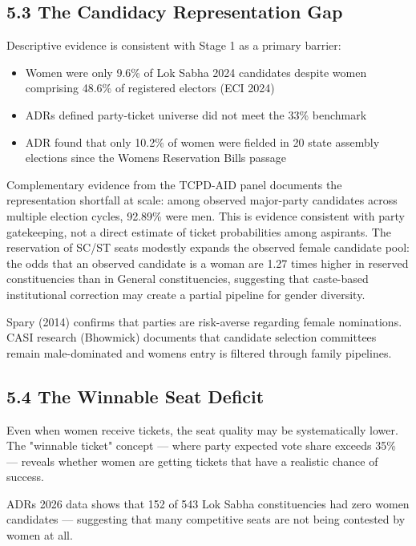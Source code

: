 \documentclass[
]{article}
\providecommand{\tightlist}{%
  \setlength{\itemsep}{0pt}\setlength{\parskip}{0pt}}
\begin{document}
\subsection{5.3 The Candidacy Representation Gap}\label{53-the-candidacy-representation-gap}

Descriptive evidence is consistent with Stage 1 as a primary barrier:

\begin{itemize}
\tightlist
\item
  Women were only 9.6\% of Lok Sabha 2024 candidates despite women comprising 48.6\% of registered electors (ECI 2024)
\item
  ADR\textquotesingle s defined party-ticket universe did not meet the 33\% benchmark
\item
  ADR found that only 10.2\% of women were fielded in 20 state assembly elections since the Women\textquotesingle s Reservation Bill\textquotesingle s passage
\end{itemize}

Complementary evidence from the TCPD-AID panel documents the representation shortfall at scale: among observed major-party candidates across multiple election cycles, 92.89\% were men. This is evidence consistent with party gatekeeping, not a direct estimate of ticket probabilities among aspirants. The reservation of SC/ST seats modestly expands the observed female candidate pool: the odds that an observed candidate is a woman are 1.27 times higher in reserved constituencies than in General constituencies, suggesting that caste-based institutional correction may create a partial pipeline for gender diversity.

Spary (2014) confirms that parties are risk-averse regarding female nominations. CASI research (Bhowmick) documents that candidate selection committees remain male-dominated and women\textquotesingle s entry is filtered through family pipelines.

\subsection{5.4 The Winnable Seat Deficit}\label{54-the-winnable-seat-deficit}

Even when women receive tickets, the seat quality may be systematically lower. The "winnable ticket" concept --- where party expected vote share exceeds 35\% --- reveals whether women are getting tickets that have a realistic chance of success.

ADR\textquotesingle s 2026 data shows that 152 of 543 Lok Sabha constituencies had zero women candidates --- suggesting that many competitive seats are not being contested by women at all.
\end{document}
